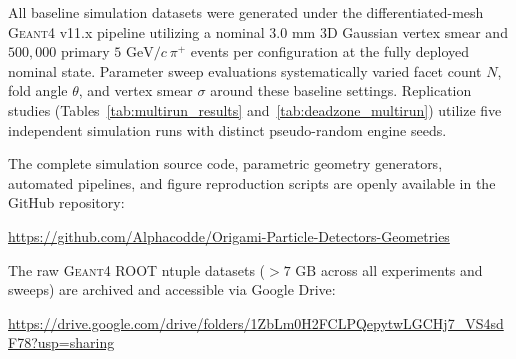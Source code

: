 \documentclass[a4paper,11pt]{article}
\begin{document}
All baseline simulation datasets were generated under the differentiated-mesh \textsc{Geant4} v11.x pipeline utilizing a nominal $3.0\text{ mm}$ 3D Gaussian vertex smear and $500{,}000$ primary $5\text{ GeV}/c\ \pi^+$ events per configuration at the fully deployed nominal state. Parameter sweep evaluations systematically varied facet count $N$, fold angle $\theta$, and vertex smear $\sigma$ around these baseline settings. Replication studies (Tables~\ref{tab:multirun_results} and~\ref{tab:deadzone_multirun}) utilize five independent simulation runs with distinct pseudo-random engine seeds.

The complete simulation source code, parametric geometry generators, automated pipelines, and figure reproduction scripts are openly available in the GitHub repository:
\begin{center}
\url{https://github.com/Alphacodde/Origami-Particle-Detectors-Geometries}
\end{center}
The raw \textsc{Geant4} ROOT ntuple datasets ($> 7\text{ GB}$ across all experiments and sweeps) are archived and accessible via Google Drive:
\begin{center}
\url{https://drive.google.com/drive/folders/1ZbLm0H2FCLPQepytwLGCHj7_VS4sdF78?usp=sharing}
\end{center}

\enlargethispage{2\baselineskip}


\end{document}
